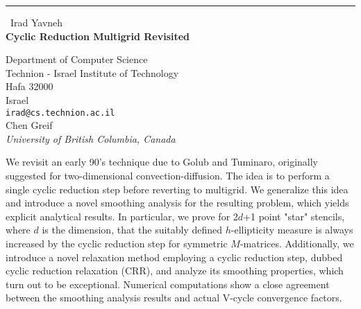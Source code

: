 \documentclass{report}
\begin{document}
\begin{center}
\rule{6in}{1pt} \
{\large Irad Yavneh \\
{\bf Cyclic Reduction Multigrid Revisited}}

Department of Computer Science \\ Technion - Israel Institute of Technology \\ Hafa 32000 \\ Israel
\\
{\tt irad@cs.technion.ac.il}\\
Chen Greif\\
{\em University of British Columbia, Canada}\end{center}

We revisit an early 90's technique due to Golub and Tuminaro, originally
suggested for two-dimensional convection-diffusion. The idea is to
perform a single cyclic reduction step before reverting to multigrid. We
generalize this idea and introduce a novel smoothing analysis for the
resulting problem, which yields explicit analytical results. In
particular, we prove for 2$d$+1 point "star" stencils, where $d$ is the
dimension, that the suitably defined $h$-ellipticity measure is always
increased by the cyclic reduction step for symmetric $M$-matrices.
Additionally, we introduce a novel relaxation method employing a cyclic
reduction step, dubbed cyclic reduction relaxation (CRR), and analyze its
smoothing properties, which turn out to be exceptional. Numerical
computations show a close agreement between the smoothing analysis
results and actual V-cycle convergence factors.
\end{document}
